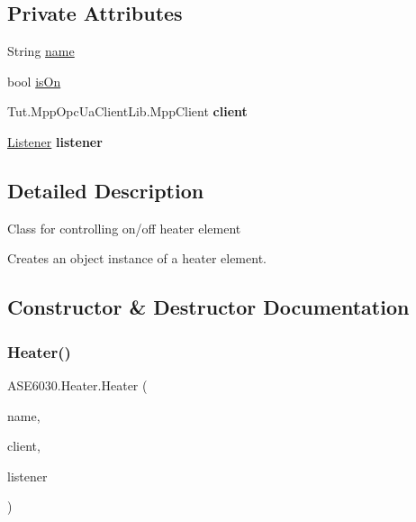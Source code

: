 \subsection*{Private Attributes}
\begin{DoxyCompactItemize}
\item 
String \hyperlink{class_a_s_e6030_1_1_heater_a0f7ba6c365f98047a0e8e7f3017fafab}{name}
\item 
bool \hyperlink{class_a_s_e6030_1_1_heater_a1f5b6ffba44e01c20fede806bf409414}{is\+On}
\item 
\mbox{\label{class_a_s_e6030_1_1_heater_a347875f91c3ddb3c6ddc6f86baa3cc5f}} 
Tut.\+Mpp\+Opc\+Ua\+Client\+Lib.\+Mpp\+Client {\bfseries client}
\item 
\mbox{\label{class_a_s_e6030_1_1_heater_a08c1090f9af468be9713984536f753b3}} 
\hyperlink{class_a_s_e6030_1_1_listener}{Listener} {\bfseries listener}
\end{DoxyCompactItemize}


\subsection{Detailed Description}
Class for controlling on/off heater element 

Creates an object instance of a heater element. 

\subsection{Constructor \& Destructor Documentation}
\mbox{\label{class_a_s_e6030_1_1_heater_a1c0420d0f56eb7e1a7d43c44520ae07b}} 
\subsubsection{\texorpdfstring{Heater()}{Heater()}}
{\footnotesize\ttfamily A\+S\+E6030.\+Heater.\+Heater (\begin{DoxyParamCaption}\item[{String}]{name,  }\item[{ref Tut.\+Mpp\+Opc\+Ua\+Client\+Lib.\+Mpp\+Client}]{client,  }\item[{ref \hyperlink{class_a_s_e6030_1_1_listener}{Listener}}]{listener }\end{DoxyParamCaption})\hspace{0.3cm}{\ttfamily [inline]}}

